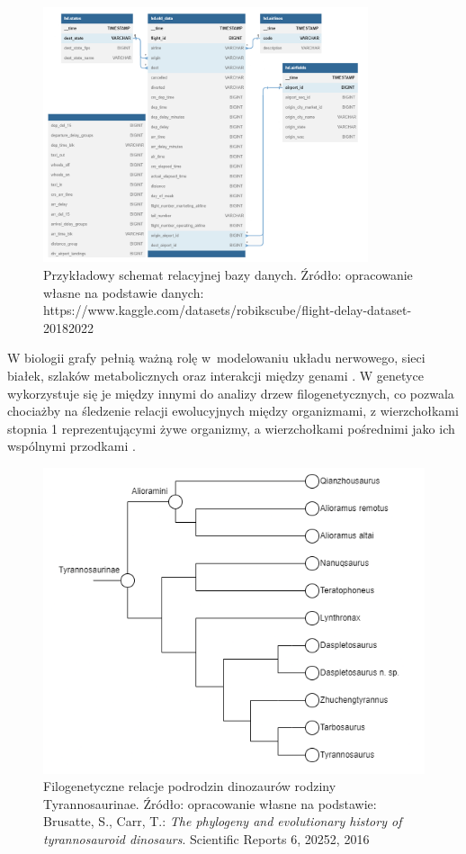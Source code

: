 \begin{figure}[ht]
	\centering
	\includegraphics[height=7.5cm]{resources/introduction/images/database.png}
	\caption{Przykładowy schemat relacyjnej bazy danych.
		Źródło: opracowanie własne na podstawie danych:
		https://www.kaggle.com/datasets/robikscube/flight-delay-dataset-20182022}
    \label{Fig:intro-2}
\end{figure}
\FloatBarrier

\clearpage

W biologii grafy pełnią ważną rolę w~modelowaniu układu nerwowego, sieci białek,
szlaków metabolicznych oraz interakcji między genami \cite{Chung2021}.
W genetyce wykorzystuje się je między innymi do analizy drzew filogenetycznych,
co pozwala chociażby na śledzenie relacji ewolucyjnych między organizmami,
z wierzchołkami stopnia 1 reprezentującymi żywe organizmy,
a wierzchołkami pośrednimi jako ich wspólnymi przodkami \cite{Erciyes2023}.

\begin{figure}[ht]
	\centering
	\includegraphics[width=12cm]{resources/introduction/images/dino.png}
	\caption{Filogenetyczne relacje podrodzin dinozaurów rodziny Tyrannosaurinae.
		Źródło: opracowanie własne na podstawie:
		Brusatte, S., Carr, T.: \textit{The phylogeny and evolutionary history of tyrannosauroid dinosaurs}. Scientific Reports 6, 20252, 2016}
    \label{Fig:intro-3}
\end{figure}
\FloatBarrier

